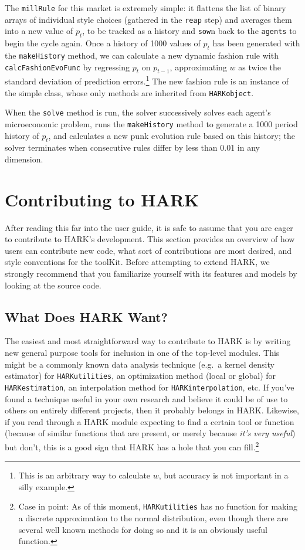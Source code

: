 \documentclass[12pt,titlepage,letterpaper]{econtex}
\begin{document}
The \texttt{millRule} for this market is extremely simple: it flattens the list of binary arrays of individual style choices (gathered in the \texttt{reap} step) and averages them into a new value of $p_t$, to be tracked as a history and \texttt{sow}n back to the \texttt{agents} to begin the cycle again.  Once a history of 1000 values of $p_t$ has been generated with the \texttt{makeHistory} method, we can calculate a new dynamic fashion rule with \texttt{calcFashionEvoFunc} by regressing $p_t$ on $p_{t-1}$, approximating $w$ as twice the standard deviation of prediction errors.\footnote{This is an arbitrary way to calculate $w$, but accuracy is not important in a silly example.}  The new fashion rule is an instance of the simple  class, whose only methods are inherited from \texttt{HARKobject}.

When the \texttt{solve} method is run, the solver successively solves each agent's microeconomic problem, runs the \texttt{makeHistory} method to generate a 1000 period history of $p_t$, and calculates a new punk evolution rule based on this history; the solver terminates when consecutive rules differ by less than 0.01 in any dimension.

\section{Contributing to HARK}\label{sec:ContributingToHARK}

After reading this far into the user guide, it is safe to assume that you are eager to contribute to HARK's development.  This section provides an overview of how users can contribute new code, what sort of contributions are most desired, and style conventions for the toolKit.  Before attempting to extend HARK, we strongly recommend that you familiarize yourself with its features and models by looking at the source code.

\subsection{What Does HARK Want?}\label{sec:WhatDoesHARKWant}

The easiest and most straightforward way to contribute to HARK is by writing new general purpose tools for inclusion in one of the top-level modules.  This might be a commonly known data analysis technique (e.g.\ a kernel density estimator) for \texttt{HARKutilities}, an optimization method (local or global) for \texttt{HARKestimation}, an interpolation method for \texttt{HARKinterpolation}, etc.  If you've found a technique useful in your own research and believe it could be of use to others on entirely different projects, then it probably belongs in HARK.  Likewise, if you read through a HARK module expecting to find a certain tool or function (because of similar functions that are present, or merely because \textit{it's very useful}) but don't, this is a good sign that HARK has a hole that you can fill.\footnote{Case in point: As of this moment, \texttt{HARKutilities} has no function for making a discrete approximation to the normal distribution, even though there are several well known methods for doing so and it is an obviously useful function.}
\end{document}
